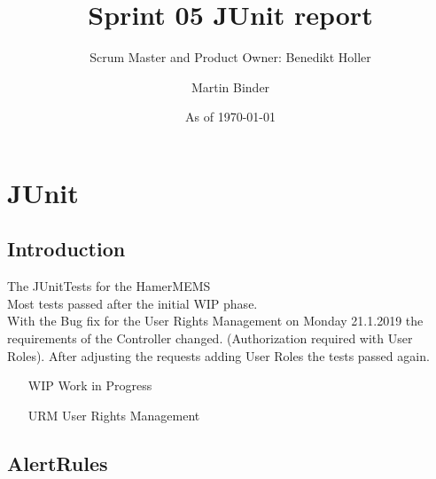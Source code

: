 \documentclass{scrreprt}
\title{Sprint 05 JUnit report}
\subtitle{Scrum Master and Product Owner: Benedikt Holler}
\author{Martin Binder}
\date{As of \today}
\begin{document}
	\maketitle
	\noindent 

\chapter{JUnit}

\section{Introduction}
The JUnitTests for the HamerMEMS \\
Most tests passed after the initial WIP phase. \\
With the Bug fix for the User Rights Management on Monday 21.1.2019 the requirements of the Controller changed. (Authorization required with User Roles).
After adjusting the requests adding User Roles the tests passed again.

\begin{itemize}
	\item[WIP] Work in Progress
	\item[URM] User Rights Management
\end{itemize}

\section{AlertRules}	

\end{document}
